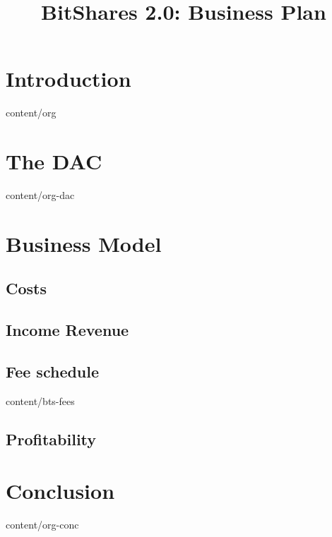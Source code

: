 \documentclass[conference,final,10pt,a4paper]{IEEEtran}
\title{BitShares 2.0: Business Plan}
\begin{document}
\sloppy
\maketitle

\begin{abstract}
\end{abstract}
\section    { Introduction   }  { content/org      } 
\section    { The DAC        }  { content/org-dac  } 
\section    { Business Model } 
\subsection { Costs          } 
\subsection { Income Revenue } 
\subsection { Fee schedule   }  { content/bts-fees } 
\subsection { Profitability  } 
\section    { Conclusion     }  { content/org-conc } 


\end{document}
